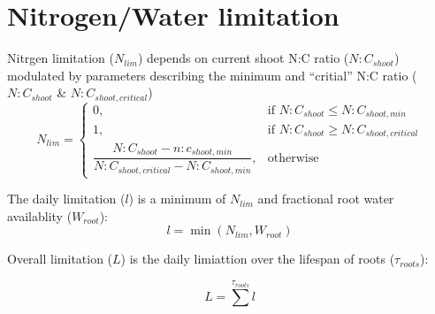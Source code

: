 \section{Nitrogen/Water limitation}

Nitrgen limitation ($N_{lim}$) depends on current shoot N:C ratio ($N:C_{shoot}$) modulated by parameters describing the minimum and ``critial'' N:C ratio ($N:C_{shoot}$ \& $N:C_{shoot,critical}$)
\begin{equation}
	N_{lim}=
	\begin{cases}
	    0,& \text{if } N:C_{shoot}\le N:C_{shoot,min} \\
	    1,& \text{if } N:C_{shoot}\ge N:C_{shoot,critical} \\
	    \dfrac{N:C_{shoot} - n:c_{shoot,min}}{N:C_{shoot,critical} - N:C_{shoot,min}},& \text{otherwise}
	\end{cases}
	\label{equ:lim1}
\end{equation}

The daily limitation  ($l$) is a minimum of $N_{lim}$ and fractional root water availablity ($W_{root}$):
\begin{equation}
	l = \min (N_{lim}, W_{root})
\end{equation}

Overall limitation ($L$) is the daily limiattion over the lifespan of roots ($\tau_{roots}$):

\begin{equation}
	L = \sum^{\tau_{roots}} l
	\label{equ:limN}
\end{equation}
